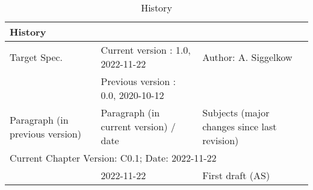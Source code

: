\begin{table}[H]
\caption{History}
\label{tab:docover_history02}
\centering
\begin{tabularx}{\textwidth}{|X |X |X |}
  \hline
  \multicolumn{3}{|l|}{History} \\
  \hline
  \multicolumn{1}{|l}{Target Spec.} & \multicolumn{1}{l}{Current version : 1.0, 2022-11-22} & \multicolumn{1}{l|}{Author: A. Siggelkow}\\
  \multicolumn{1}{|l}{ } & \multicolumn{1}{l}{Previous version : 0.0, 2020-10-12} & \multicolumn{1}{l|}{ }\\
  \hline
  \hline
  Paragraph (in previous version) & Paragraph (in current version) / date & Subjects (major changes since last revision) \\
  \hline
  \hline
  \multicolumn{3}{|l|}{Current Chapter Version: C0.1; Date: 2022-11-22} \\
  \hline
  & 2022-11-22 & First draft (AS) \\
  \hline
\end{tabularx}
\end{table}
